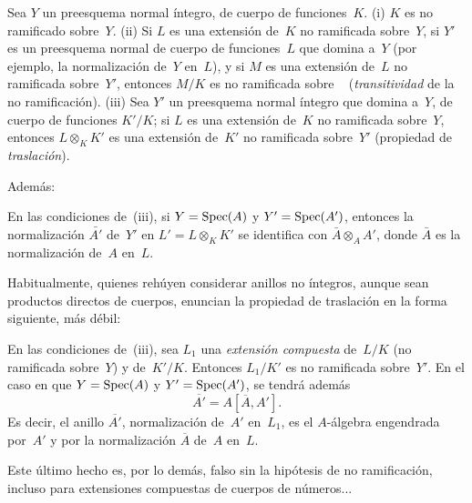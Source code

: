 \begin{proposition}
\label{I.10.4}
Sea $Y$ un preesquema normal íntegro, de cuerpo de funciones~$K$.
\textup{(i)} $K$ es no ramificado sobre~$Y$.
\textup{(ii)} Si $L$ es una extensión de~$K$ no ramificada sobre~$Y$, si $Y'$ es un preesquema normal de cuerpo de funciones~$L$ que domina a~$Y$ (por ejemplo, la normalización de~$Y$ en~$L$), y si $M$ es una extensión de~$L$ no ramificada sobre~$Y'$, entonces $M/K$ es no ramificada sobre
\ %
(\emph{transitividad} de la no ramificación).
\textup{(iii)} Sea $Y'$ un preesquema normal íntegro que domina a~$Y$, de cuerpo de funciones $K'/K$; si $L$ es una extensión de~$K$ no ramificada sobre~$Y$, entonces $L\otimes_KK'$ es una extensión de~$K'$ no ramificada sobre~$Y'$ (propiedad de \emph{traslación}).
\end{proposition}

Además:

\begin{corollaire}
\label{I.10.5}
En las condiciones de~\textup{(iii)}, si $Y=\operatorname{Spec}(A)$ y $Y'=\operatorname{Spec}(A')$, entonces la normalización $\bar{A'}$ de~$Y'$ en $L'=L\otimes_KK'$ se identifica con $\bar{A}\otimes_AA'$, donde $\bar{A}$ es la normalización de~$A$ en~$L$.
\end{corollaire}

Habitualmente, quienes rehúyen considerar anillos no íntegros, aunque sean productos directos de cuerpos, enuncian la propiedad de traslación en la forma siguiente, más débil:

\begin{corollaire}
\label{I.10.6}
En las condiciones de~\textup{(iii)}, sea $L_1$ una \emph{extensión compuesta} de~$L/K$ (no ramificada sobre~$Y$) y de~$K'/K$. Entonces $L_1/K'$ es no ramificada sobre~$Y'$. En el caso en que $Y=\operatorname{Spec}(A)$ y $Y'=\operatorname{Spec}(A')$, se tendrá además
\[
\overline{A'}=A[\overline{A},A'].
\]
Es decir, el anillo $\overline{A'}$, normalización de~$A'$ en~$L_1$, es el $A$-álgebra engendrada por~$A'$ y por la normalización $\overline{A}$ de~$A$ en~$L$.
\end{corollaire}

Este último hecho es, por lo demás, falso sin la hipótesis de no ramificación, incluso para extensiones compuestas de cuerpos de números...
